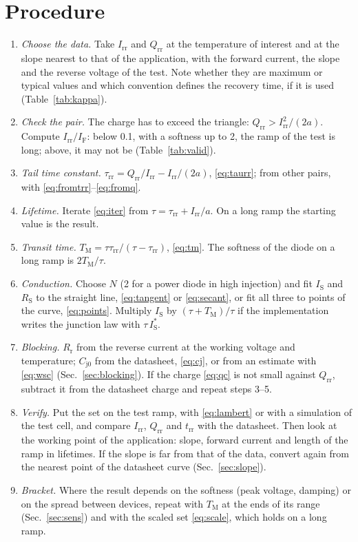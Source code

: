 \documentclass[10pt,a4paper]{scrartcl}
\newcommand{\IF}{I_\mathrm{F}}
\newcommand{\Irr}{I_\mathrm{rr}}
\newcommand{\Qrr}{Q_\mathrm{rr}}
\newcommand{\trr}{t_\mathrm{rr}}
\newcommand{\taurr}{\tau_\mathrm{rr}}
\newcommand{\TM}{T_\mathrm{M}}
\newcommand{\IS}{I_\mathrm{S}}
\newcommand{\RS}{R_\mathrm{S}}
\newcommand{\Rr}{R_\mathrm{r}}
\newcommand{\Cjo}{C_\mathrm{j0}}
\newcommand{\Nem}{N}                          %
\begin{document}
\section{Procedure}
\label{sec:procedure}
\begin{enumerate}
\item \emph{Choose the data.} Take $\Irr$ and $\Qrr$ at the temperature of interest and at the slope nearest to that of the application, with the forward current, the slope and the reverse voltage of the test. Note whether they are maximum or typical values and which convention defines the recovery time, if it is used (Table~\ref{tab:kappa}).
\item \emph{Check the pair.} The charge has to exceed the triangle: $\Qrr > \Irr^2/(2a)$. Compute $\Irr/\IF$: below \num{0.1}, with a softness up to 2, the ramp of the test is long; above, it may not be (Table~\ref{tab:valid}).
\item \emph{Tail time constant.} $\taurr = \Qrr/\Irr - \Irr/(2a)$, \eqref{eq:taurr}; from other pairs, with \eqref{eq:fromtrr}--\eqref{eq:fromq}.
\item \emph{Lifetime.} Iterate \eqref{eq:iter} from $\tau = \taurr + \Irr/a$. On a long ramp the starting value is the result.
\item \emph{Transit time.} $\TM = \tau\taurr/(\tau-\taurr)$, \eqref{eq:tm}. The softness of the diode on a long ramp is $2\TM/\tau$.
\item \emph{Conduction.} Choose $\Nem$ (2 for a power diode in high injection) and fit $\IS$ and $\RS$ to the straight line, \eqref{eq:tangent} or \eqref{eq:secant}, or fit all three to points of the curve, \eqref{eq:points}. Multiply $\IS$ by $(\tau+\TM)/\tau$ if the implementation writes the junction law with $\tau\,\IS^{*}$.
\item \emph{Blocking.} $\Rr$ from the reverse current at the working voltage and temperature; $\Cjo$ from the datasheet, \eqref{eq:cj}, or from an estimate with \eqref{eq:wsc} (Sec.~\ref{sec:blocking}). If the charge \eqref{eq:qc} is not small against $\Qrr$, subtract it from the datasheet charge and repeat steps 3--5.
\item \emph{Verify.} Put the set on the test ramp, with \eqref{eq:lambert} or with a simulation of the test cell, and compare $\Irr$, $\Qrr$ and $\trr$ with the datasheet. Then look at the working point of the application: slope, forward current and length of the ramp in lifetimes. If the slope is far from that of the data, convert again from the nearest point of the datasheet curve (Sec.~\ref{sec:slope}).
\item \emph{Bracket.} Where the result depends on the softness (peak voltage, damping) or on the spread between devices, repeat with $\TM$ at the ends of its range (Sec.~\ref{sec:sens}) and with the scaled set \eqref{eq:scale}, which holds on a long ramp.
\end{enumerate}
\end{document}
